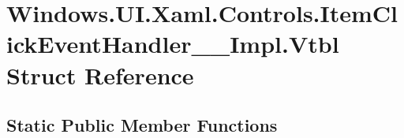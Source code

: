 \hypertarget{struct_windows_1_1_u_i_1_1_xaml_1_1_controls_1_1_item_click_event_handler_____impl_1_1_vtbl}{}\section{Windows.\+U\+I.\+Xaml.\+Controls.\+Item\+Click\+Event\+Handler\+\_\+\+\_\+\+Impl.\+Vtbl Struct Reference}
\label{struct_windows_1_1_u_i_1_1_xaml_1_1_controls_1_1_item_click_event_handler_____impl_1_1_vtbl}
\subsection*{Static Public Member Functions}
